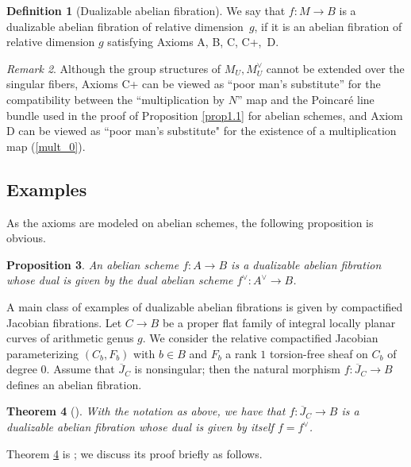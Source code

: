 \documentclass[11pt]{amsart}
\theoremstyle{plain}
\newtheorem{thm}{Theorem}[section]
\newtheorem{prop}[thm]{Proposition}
\theoremstyle{definition}
\newtheorem{defn}[thm]{Definition}
\theoremstyle{remark}
\newtheorem{rmk}[thm]{Remark}
\begin{document}
\begin{defn}[Dualizable abelian fibration]
    We say that $f: M \to B$ is a dualizable abelian fibration of relative dimen\-sion~$g$, if it is an abelian fibration of relative dimension $g$ satisfying Axioms A, B, C, C+,~D.
\end{defn}



\begin{rmk}
Although the group structures of $M_U, M^\vee_U$ cannot be extended over the singular fibers, Axioms C+ can be viewed as “poor man’s substitute” for the compatibility between the ``multiplication by $N$'' map and the Poincar\'e line bundle used in the proof of Proposition \ref{prop1.1} for abelian schemes, and Axiom D can be viewed as ``poor man's substitute" for the existence of a multiplication map (\ref{mult_0}).
\end{rmk}



\subsection{Examples}\label{sec2.3} As the axioms are modeled on abelian schemes, the following proposition is obvious.

\begin{prop}
    An abelian scheme $f: A \to B$ is a dualizable abelian fibration whose dual is given by the dual abelian scheme $f^\vee: A^\vee \to B$. 
\end{prop}



A main class of examples of dualizable abelian fibrations is given by compactified Jacobian fibrations. Let $C \to B$ be a proper flat family of integral locally planar curves of arithmetic genus $g$. We consider the relative compactified Jacobian parameterizing $(C_b, F_b)$ with $b\in B$ and $F_b$ a rank $1$ torsion-free sheaf on $C_b$ of degree $0$. Assume that $\overline{J}_C$ is nonsingular; then the natural morphism $f: \overline{J}_C \to B$ defines an abelian fibration.

\begin{thm}[\cite{MSY}]\label{thm2.6}
    With the notation as above, we have that $f: \overline{J}_C \to B$ is a dualizable abelian fibration whose dual is given by itself $f=f^\vee$.
\end{thm}

Theorem \ref{thm2.6} is \cite[Theorem 0.2]{MSY}; we discuss its proof briefly as follows.
\end{document}
